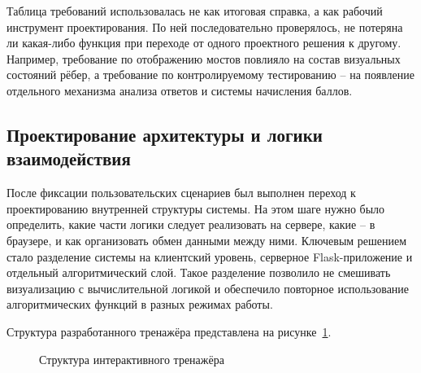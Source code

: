 \documentclass[a4paper,12pt]{extarticle}
\begin{document}
Таблица требований использовалась не как итоговая справка, а как рабочий инструмент проектирования. По ней последовательно проверялось, не потеряна ли какая-либо функция при переходе от одного проектного решения к другому. Например, требование по отображению мостов повлияло на состав визуальных состояний рёбер, а требование по контролируемому тестированию -- на появление отдельного механизма анализа ответов и системы начисления баллов.

\subsection{Проектирование архитектуры и логики взаимодействия}

После фиксации пользовательских сценариев был выполнен переход к проектированию внутренней структуры системы. На этом шаге нужно было определить, какие части логики следует реализовать на сервере, какие -- в браузере, и как организовать обмен данными между ними. Ключевым решением стало разделение системы на клиентский уровень, серверное Flask-приложение и отдельный алгоритмический слой. Такое разделение позволило не смешивать визуализацию с вычислительной логикой и обеспечило повторное использование алгоритмических функций в разных режимах работы.

Структура разработанного тренажёра представлена на рисунке~\ref{fig:architecture}.

\begin{figure}[H]
\centering
{}
\caption{Структура интерактивного тренажёра}
\label{fig:architecture}
\end{figure}
\end{document}
